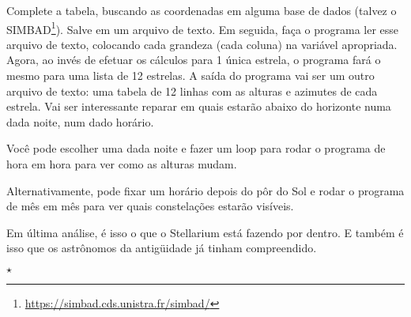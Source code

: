 \noindent Complete a tabela, buscando as coordenadas em alguma base de dados (talvez o SIMBAD\footnote{\url{https://simbad.cds.unistra.fr/simbad/}}). Salve em um arquivo de texto. Em seguida, faça o programa ler esse arquivo de texto, colocando cada grandeza (cada coluna) na variável apropriada. Agora, ao invés de efetuar os cálculos para 1 única estrela, o programa fará o mesmo para uma lista de 12 estrelas. A saída do programa vai ser um outro arquivo de texto: uma tabela de 12 linhas com as alturas e azimutes de cada estrela. Vai ser interessante reparar em quais estarão abaixo do horizonte numa dada noite, num dado horário.

Você pode escolher uma dada noite e fazer um loop para rodar o programa de hora em hora para ver como as alturas mudam.

Alternativamente, pode fixar um horário depois do pôr do Sol e rodar o programa de mês em mês para ver quais constelações estarão visíveis.

Em última análise, é isso o que o Stellarium está fazendo por dentro. E também é isso que os astrônomos da antigüidade já tinham compreendido.

\vspace{2cm}
\begin{center}
 $\star$
\end{center}


